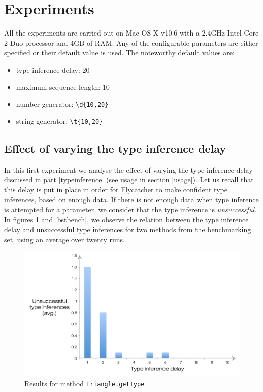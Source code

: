 \section{Experiments}
All the experiments are carried out on Mac OS X v10.6 with a 2.4GHz Intel Core 2 Duo processor and 4GB of RAM. Any of the configurable parameters are either specified or their default value is used. The noteworthy default values are:

\begin{itemize}
   \item type inference delay: 20
   \item maximum sequence length: 10
   \item number generator: \texttt{\textbackslash d\{10,20\}}
   \item string generator: \texttt{\textbackslash t\{10,20\}}
\end{itemize}

\subsection{Effect of varying the type inference delay}
In this first experiment we analyse the effect of varying the type inference delay discussed in part \ref{typeinference} (see usage in section \ref{usage}). Let us recall that this delay is put in place in order for \textsf{Flycatcher} to make confident type inferences, based on enough data. If there is not enough data when type inference is attempted for a parameter, we consider that the type inference is \emph{unsuccessful}. In figures \ref{trianglebench} and \ref{bstbench}, we observe the relation between the type inference delay and unsuccessful type inferences for two methods from the benchmarking set, using an average over twenty runs.

\begin{figure}[h]
\hspace*{-0.5cm}
\centering
\includegraphics[scale=0.55]{./components/chapter7/triangle.pdf}
\caption{Results for method \texttt{Triangle.getType}}
\label{trianglebench}
\end{figure}

